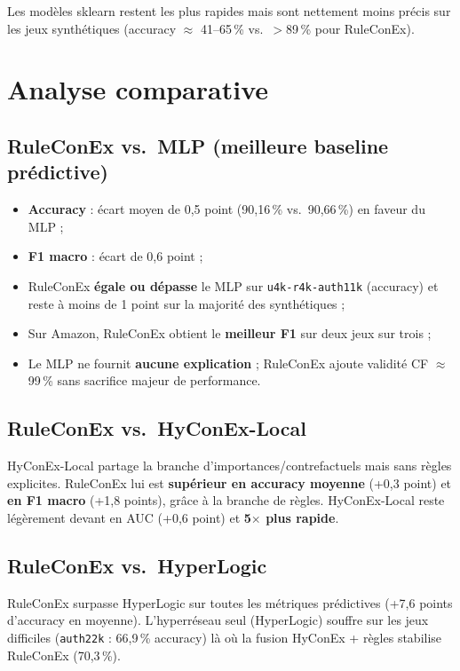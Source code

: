 \documentclass[11pt,a4paper]{article}
\begin{document}
Les modèles sklearn restent les plus rapides mais sont nettement moins précis sur les jeux synthétiques (accuracy $\approx$ 41--65\,\% vs.\ $>$89\,\% pour RuleConEx).

\section{Analyse comparative}

\subsection{RuleConEx vs.\ MLP (meilleure baseline prédictive)}

\begin{itemize}
  \item \textbf{Accuracy} : écart moyen de 0,5 point (90,16\,\% vs.\ 90,66\,\%) en faveur du MLP ;
  \item \textbf{F1 macro} : écart de 0,6 point ;
  \item RuleConEx \textbf{égale ou dépasse} le MLP sur \texttt{u4k-r4k-auth11k} (accuracy) et reste à moins de 1 point sur la majorité des synthétiques ;
  \item Sur Amazon, RuleConEx obtient le \textbf{meilleur F1} sur deux jeux sur trois ;
  \item Le MLP ne fournit \textbf{aucune explication} ; RuleConEx ajoute validité CF $\approx$ 99\,\% sans sacrifice majeur de performance.
\end{itemize}

\subsection{RuleConEx vs.\ HyConEx-Local}

HyConEx-Local partage la branche d'importances/contrefactuels mais sans règles explicites. RuleConEx lui est \textbf{supérieur en accuracy moyenne} (+0,3 point) et \textbf{en F1 macro} (+1,8 points), grâce à la branche de règles. HyConEx-Local reste légèrement devant en AUC (+0,6 point) et \textbf{5$\times$ plus rapide}.

\subsection{RuleConEx vs.\ HyperLogic}

RuleConEx surpasse HyperLogic sur toutes les métriques prédictives (+7,6 points d'accuracy en moyenne). L'hyperréseau seul (HyperLogic) souffre sur les jeux difficiles (\texttt{auth22k} : 66,9\,\% accuracy) là où la fusion HyConEx + règles stabilise RuleConEx (70,3\,\%).
\end{document}
